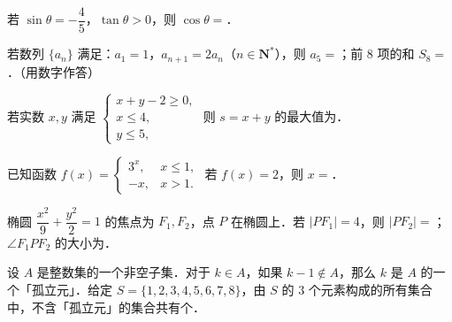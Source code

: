 \begin{question}
若 $\sin\theta=-\dfrac45$，$\tan\theta>0$，则 $\cos\theta=$\gkblank{}．

\end{question}
\begin{question}
若数列 $\{a_n\}$ 满足：$a_1=1$，$a_{n+1}=2a_n$（$n\in\mathbf N^*$），则 $a_5=$\gkblank{}；前 $8$ 项的和 $S_8=$\gkblank{}．（用数字作答）

\end{question}
\begin{question}
若实数 $x,y$ 满足 $\begin{cases}x+y-2\geqslant0,\\ x\leqslant4,\\ y\leqslant5,\end{cases}$ 则 $s=x+y$ 的最大值为\gkblank{}．

\end{question}
\begin{question}
已知函数 $f(x)=\begin{cases}3^x,&x\leqslant1,\\ -x,&x>1.\end{cases}$ 若 $f(x)=2$，则 $x=$\gkblank{}．

\end{question}
\begin{question}
椭圆 $\dfrac{x^2}{9}+\dfrac{y^2}{2}=1$ 的焦点为 $F_1,F_2$，点 $P$ 在椭圆上．若 $|PF_1|=4$，则 $|PF_2|=$\gkblank{}；$\angle F_1PF_2$ 的大小为\gkblank{}．

\end{question}
\begin{question}
设 $A$ 是整数集的一个非空子集．对于 $k\in A$，如果 $k-1\notin A$，那么 $k$ 是 $A$ 的一个「孤立元」．给定 $S=\{1,2,3,4,5,6,7,8\}$，由 $S$ 的 $3$ 个元素构成的所有集合中，不含「孤立元」的集合共有\gkblank{}个．

\end{question}

